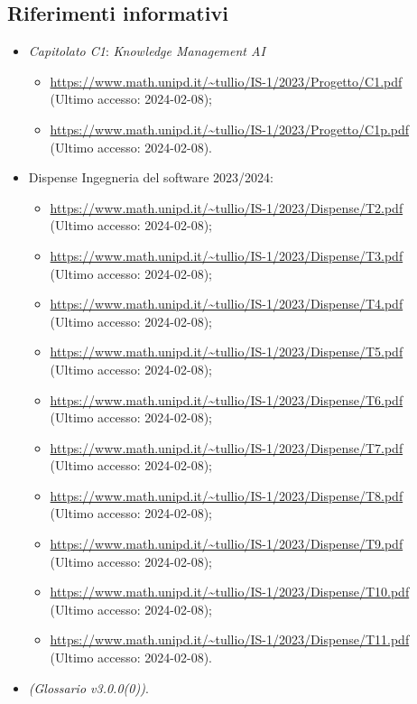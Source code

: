 \documentclass[10pt, a4paper]{article}
\begin{document}
    \subsection{Riferimenti informativi}
    \begin{itemize}
        \item \textit{Capitolato C1}: \textit{Knowledge Management AI}
        \begin{itemize}
            \item \url{https://www.math.unipd.it/~tullio/IS-1/2023/Progetto/C1.pdf}\\
            (Ultimo accesso: 2024-02-08);
            \item \url{https://www.math.unipd.it/~tullio/IS-1/2023/Progetto/C1p.pdf}\\
            (Ultimo accesso: 2024-02-08).
        \end{itemize}
        \item Dispense Ingegneria del software 2023/2024:
        \begin{itemize}
            \item \url{https://www.math.unipd.it/~tullio/IS-1/2023/Dispense/T2.pdf}\\
            (Ultimo accesso: 2024-02-08);
            \item \url{https://www.math.unipd.it/~tullio/IS-1/2023/Dispense/T3.pdf}\\
            (Ultimo accesso: 2024-02-08);
            \item \url{https://www.math.unipd.it/~tullio/IS-1/2023/Dispense/T4.pdf}\\
            (Ultimo accesso: 2024-02-08);
            \item \url{https://www.math.unipd.it/~tullio/IS-1/2023/Dispense/T5.pdf}\\
            (Ultimo accesso: 2024-02-08);
            \item \url{https://www.math.unipd.it/~tullio/IS-1/2023/Dispense/T6.pdf}\\
            (Ultimo accesso: 2024-02-08);
            \item \url{https://www.math.unipd.it/~tullio/IS-1/2023/Dispense/T7.pdf}\\
            (Ultimo accesso: 2024-02-08);
            \item \url{https://www.math.unipd.it/~tullio/IS-1/2023/Dispense/T8.pdf}\\
            (Ultimo accesso: 2024-02-08);
            \item \url{https://www.math.unipd.it/~tullio/IS-1/2023/Dispense/T9.pdf}\\
            (Ultimo accesso: 2024-02-08);
            \item \url{https://www.math.unipd.it/~tullio/IS-1/2023/Dispense/T10.pdf}\\
            (Ultimo accesso: 2024-02-08);
            \item \url{https://www.math.unipd.it/~tullio/IS-1/2023/Dispense/T11.pdf}\\
            (Ultimo accesso: 2024-02-08).
        \end{itemize}
        \item \textit{(Glossario v3.0.0(0))}.
        

\end{itemize}
\end{document}
